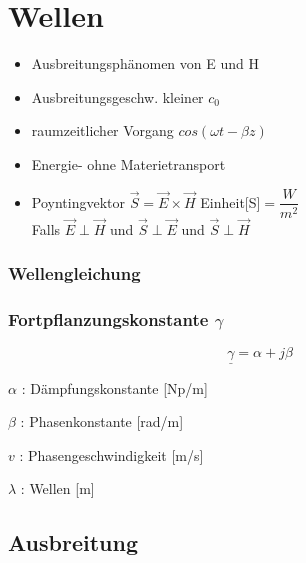 \section{Wellen}
\begin{itemize}
    \setlength\itemsep{1pt}
    \item Ausbreitungsphänomen von E und H
    \item Ausbreitungsgeschw. kleiner $c_0$
    \item raumzeitlicher Vorgang $cos(\omega t- \beta z)$
    \item Energie- ohne Materietransport
    \item Poyntingvektor $\vec{S}=\vec{E}\times\vec{H}$ Einheit[S]$= \dfrac{W}{m^2}$\\
          {\footnotesize Falls $\vec{E}\perp\vec{H}$ und $\vec{S}\perp\vec{E}$ und $\vec{S}\perp\vec{H}$}
\end{itemize}

\subsubsection*{Wellengleichung}

\subsubsection*{Fortpflanzungskonstante $\gamma$}
\[\boxed{\underline{\gamma}=\alpha+j\beta}\]

$\alpha$ : Dämpfungskonstante [Np/m]

$\beta$ : Phasenkonstante [rad/m]

$v$ : Phasengeschwindigkeit [m/s]

$\lambda$ : Wellen [m]

\subsection{Ausbreitung}
